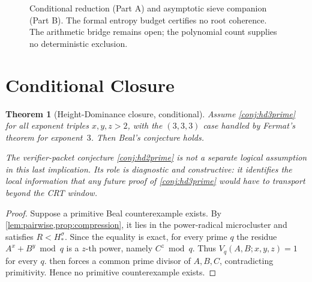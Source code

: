 \documentclass[11pt,a4paper]{article}
\newtheorem{theorem}{Theorem}[section]
\begin{document}
\begin{figure}[htbp]
{}
\caption{Conditional reduction (Part A) and asymptotic sieve companion (Part B). The formal entropy budget certifies no root coherence. The arithmetic bridge remains open; the polynomial count supplies no deterministic exclusion.}
\label{fig:bhd_architecture}
\end{figure}

\section{Conditional Closure}

\begin{theorem}[Height-Dominance closure, conditional]
\label{thm:conditional-closure}
Assume \cref{conj:hd3prime} for all exponent triples $x,y,z>2$, with
the $(3,3,3)$ case handled by Fermat's theorem for exponent~$3$. Then
Beal's conjecture holds.

The verifier-packet conjecture \cref{conj:hd2prime} is not a separate
logical assumption in this last implication. Its role is diagnostic and
constructive: it identifies the local information that any future proof
of \cref{conj:hd3prime} would have to transport beyond the CRT window.
\end{theorem}

\begin{proof}
Suppose a primitive Beal counterexample exists. By
\cref{lem:pairwise,prop:compression}, it lies in the power-radical
microcluster and satisfies $R < H_*^{\sigma}$. Since the equality is
exact, for every prime $q$ the residue $A^x+B^y \bmod q$ is a $z$-th
power, namely $C^z \bmod q$. Thus $V_q(A,B;x,y,z)=1$ for every $q$.
 then forces a common prime divisor of $A,B,C$,
contradicting primitivity. Hence no primitive counterexample exists.
\end{proof}
\end{document}
